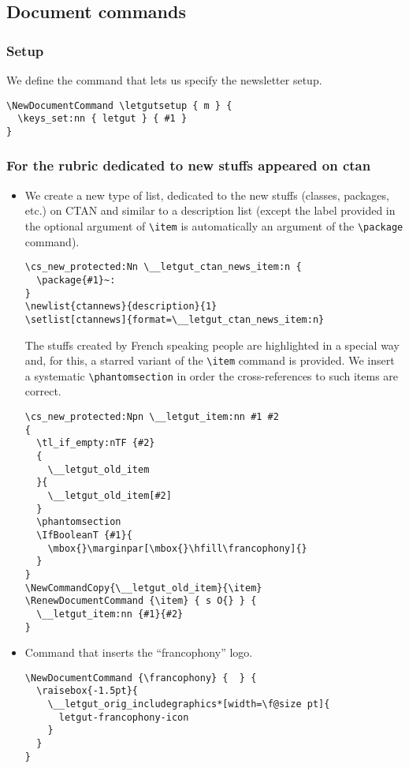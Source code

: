 \documentclass{letgut}
\begin{document}
\subsection{Document commands}
\label{ImplementationDocumentcommands-s1qg55h0jlj0}
\subsubsection{Setup}
\label{ImplementationDocumentcommandsSetup-roqg55h0jlj0}
We define the command that lets us specify the newsletter setup.

\begin{lstlisting}
\NewDocumentCommand \letgutsetup { m } {
  \keys_set:nn { letgut } { #1 }
}
\end{lstlisting}

\subsubsection{For the rubric dedicated to new stuffs appeared on \acs{ctan}}
\label{ImplementationDocumentcommandsFortherubricdedicatedtonewstuffsappearedonacsctan-jerg55h0jlj0}
\begin{itemize}
\item We create a new type of list, dedicated to the new stuffs (classes, packages,
etc.) on CTAN and similar to a description list (except the label provided in
the optional argument of \lstinline+\item+ is automatically an argument of the
\lstinline+\package+ command).
\begin{lstlisting}
\cs_new_protected:Nn \__letgut_ctan_news_item:n {
  \package{#1}~:
}
\newlist{ctannews}{description}{1}
\setlist[ctannews]{format=\__letgut_ctan_news_item:n}
\end{lstlisting}
The stuffs created by French speaking people are highlighted in a special
way and, for this, a starred variant of the \lstinline+\item+ command is provided. We
insert a systematic \lstinline+\phantomsection+ in order the cross-references to such
items are correct.
\begin{lstlisting}
\cs_new_protected:Npn \__letgut_item:nn #1 #2
{
  \tl_if_empty:nTF {#2}
  {
    \__letgut_old_item
  }{
    \__letgut_old_item[#2]
  }
  \phantomsection
  \IfBooleanT {#1}{
    \mbox{}\marginpar[\mbox{}\hfill\francophony]{}
  }
}
\NewCommandCopy{\__letgut_old_item}{\item}
\RenewDocumentCommand {\item} { s O{} } {
  \__letgut_item:nn {#1}{#2}
}
\end{lstlisting}
\end{itemize}
\begin{itemize}
\item Command that inserts the \enquote{francophony} logo.
\begin{lstlisting}
\NewDocumentCommand {\francophony} {  } {
  \raisebox{-1.5pt}{
    \__letgut_orig_includegraphics*[width=\f@size pt]{
      letgut-francophony-icon
    }
  }
}
\end{lstlisting}
\end{itemize}
\end{document}
